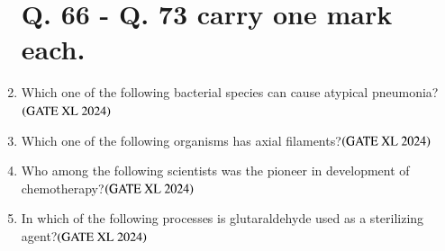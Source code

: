 \documentclass[journal]{IEEEtran}
\begin{document}
\begin{enumerate}
\section*{Q. 66 - Q. 73 carry one mark each.} 
\setcounter{enumi}{65}
    \item Which one of the following bacterial species can cause atypical pneumonia?\hfill $\left(\text{GATE XL 2024}\right)$
    \begin{enumerate}
    \end{enumerate}

    \item Which one of the following organisms has axial filaments?\hfill $\left(\text{GATE XL 2024}\right)$
    \begin{enumerate}
    \end{enumerate}

    \item Who among the following scientists was the pioneer in development of chemotherapy?\hfill $\left(\text{GATE XL 2024}\right)$
    \begin{enumerate}
    \end{enumerate}

    \item In which of the following processes is glutaraldehyde used as a sterilizing agent?\hfill $\left(\text{GATE XL 2024}\right)$
    \begin{enumerate}
    \end{enumerate}


\end{enumerate}
\end{document}
